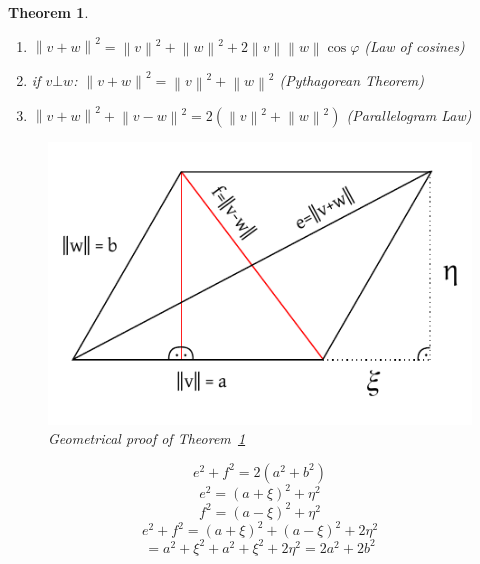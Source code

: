 \documentclass[a4paper]{article}
\newcounter{lecref}[section]
\numberwithin{lecref}{section}
\newtheorem{theorem}[lecref]{Theorem}
\newcommand{\norm}[1]{\left\|#1\right\|}
\begin{document}
\begin{theorem} %
  \label{thm834}
  \begin{enumerate}
    \item $\norm{v + w}^2 = \norm{v}^2 + \norm{w}^2 + 2 \norm v \norm w \cos{\varphi}$ (Law of cosines)
    \item if $v \bot w$: $\norm {v + w}^2 = \norm{v}^2 + \norm{w}^2$ (Pythagorean Theorem)
    \item $\norm{v + w}^2 + \norm{v - w}^2 = 2 (\norm{v}^2 + \norm{w}^2)$ (Parallelogram Law)
  \end{enumerate}

  \begin{figure}[!ht]
    \begin{center}
      \includegraphics{img/06_geometrical_proof.pdf}
      \caption{Geometrical proof of Theorem~\ref{thm834}}
    \end{center}
  \end{figure}

  \[ e^2 + f^2 = 2 (a^2 + b^2) \]
  \[ e^2 = (a + \xi)^2 + \eta^2 \]
  \[ f^2 = (a - \xi)^2 + \eta^2 \]
  \[ e^2 + f^2 = (a + \xi)^2 + (a - \xi)^2 + 2\eta^2 \]
  \[ = a^2 + \xi^2 + a^2 + \xi^2 + 2\eta^2 = 2a^2 + 2b^2 \]
\end{theorem}
\end{document}
